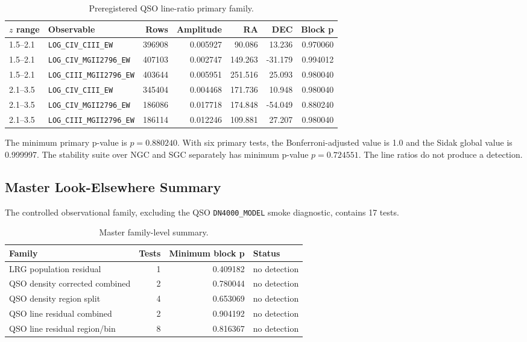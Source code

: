 \documentclass[11pt]{article}
\begin{document}
\begin{table}[h]
\centering
\caption{Preregistered QSO line-ratio primary family.}
\begin{tabular}{llrrrrr}
\toprule
$z$ range & Observable & Rows & Amplitude & RA & DEC & Block p \\
\midrule
1.5--2.1 & \texttt{LOG\_CIV\_CIII\_EW} & 396908 & 0.005927 & 90.086 & 13.236 & 0.970060 \\
1.5--2.1 & \texttt{LOG\_CIV\_MGII2796\_EW} & 407103 & 0.002747 & 149.263 & -31.179 & 0.994012 \\
1.5--2.1 & \texttt{LOG\_CIII\_MGII2796\_EW} & 403644 & 0.005951 & 251.516 & 25.093 & 0.980040 \\
2.1--3.5 & \texttt{LOG\_CIV\_CIII\_EW} & 345404 & 0.004468 & 171.736 & 10.948 & 0.980040 \\
2.1--3.5 & \texttt{LOG\_CIV\_MGII2796\_EW} & 186086 & 0.017718 & 174.848 & -54.049 & 0.880240 \\
2.1--3.5 & \texttt{LOG\_CIII\_MGII2796\_EW} & 186114 & 0.012246 & 109.881 & 27.207 & 0.980040 \\
\bottomrule
\end{tabular}
\end{table}

The minimum primary p-value is $p=0.880240$. With six primary tests, the Bonferroni-adjusted value is 1.0 and the Sidak global value is 0.999997. The stability suite over NGC and SGC separately has minimum p-value $p=0.724551$. The line ratios do not produce a detection.

\subsection{Master Look-Elsewhere Summary}

The controlled observational family, excluding the QSO \texttt{DN4000\_MODEL} smoke diagnostic, contains 17 tests.

\begin{table}[h]
\centering
\caption{Master family-level summary.}
\begin{tabular}{lrrl}
\toprule
Family & Tests & Minimum block p & Status \\
\midrule
LRG population residual & 1 & 0.409182 & no detection \\
QSO density corrected combined & 2 & 0.780044 & no detection \\
QSO density region split & 4 & 0.653069 & no detection \\
QSO line residual combined & 2 & 0.904192 & no detection \\
QSO line residual region/bin & 8 & 0.816367 & no detection \\
\bottomrule
\end{tabular}
\end{table}
\end{document}
